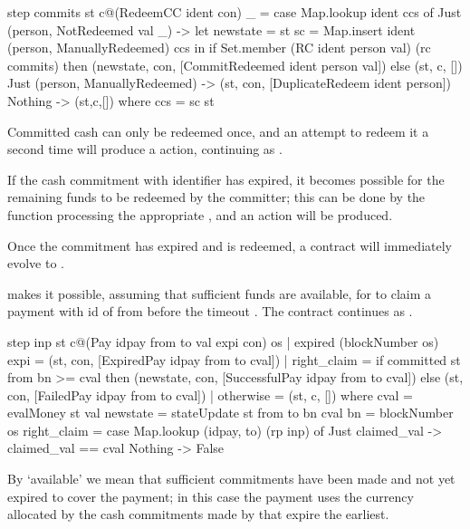 \documentclass[runningheads]{llncs}
\begin{document}
\begin{haskellcode}
step commits st c@(RedeemCC ident con) _ =
    case Map.lookup ident ccs of
      Just (person, NotRedeemed val _) ->
        let newstate = 
                st {sc = Map.insert ident (person, ManuallyRedeemed) ccs} in
        if Set.member (RC ident person val) (rc commits)
        then (newstate, con, [CommitRedeemed ident person val])
        else (st, c, [])
      Just (person, ManuallyRedeemed) ->
        (st, con, [DuplicateRedeem ident person])
      Nothing -> (st,c,[])
    where
        ccs = sc st
\end{haskellcode}
Committed cash can only be redeemed once, and an attempt to redeem it a second time will produce a  
 action, continuing as .

If the cash commitment with identifier  has expired, it becomes possible for the remaining funds 
to be redeemed by the committer; this can be done by the  function processing the appropriate 
, and an  action will be produced. 

Once the commitment  has expired and is redeemed, a  contract 
will 
immediately evolve to .

\medskip
\noindent
{} makes it possible, assuming that sufficient funds are available, for 
 to claim a payment with id  of  from  
before the timeout . The contract continues as . 

\begin{haskellcode}
step inp st c@(Pay idpay from to val expi con) os
  | expired (blockNumber os) expi = (st, con, [ExpiredPay idpay from to cval])
  | right_claim =
    if committed st from bn >= cval
      then (newstate, con, [SuccessfulPay idpay from to cval])
      else (st, con, [FailedPay idpay from to cval])
  | otherwise = (st, c, [])
  where
    cval = evalMoney st val
    newstate = stateUpdate st from to bn cval
    bn = blockNumber os
    right_claim =
      case Map.lookup (idpay, to) (rp inp) of
        Just claimed_val -> claimed_val == cval
        Nothing -> False
\end{haskellcode}
By `available' we mean that sufficient commitments have been made and not yet expired to cover the payment; in this 
case the payment uses the currency allocated by the cash commitments made by  that expire the 
earliest.
\end{document}

